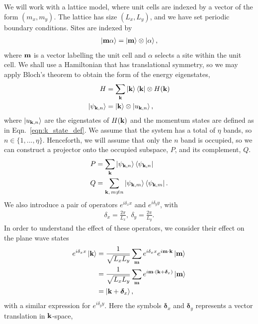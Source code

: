 We will work with a lattice model, where unit cells are indexed by a vector of the form $(m_x,m_y)$. The lattice has size $(L_x,L_y)$, and we have set periodic boundary conditions. Sites are indexed by 
\begin{align}
	\ket{\textbf m \alpha} = \ket{\textbf m} \otimes \ket{\alpha},
\end{align} 
where $\textbf m$ is a vector labelling the unit cell and $\alpha$ selects a site within the unit cell. We shall use a Hamiltonian that has translational symmetry, so we may apply Bloch's theorem to obtain the form of the energy eigenstates,
\begin{align}
	 H &= \sum_{\textbf k} \ket{\textbf k}\bra{\textbf k}\otimes  H(\textbf k) \\ 
	\ket{\psi_{\textbf k, n}} &= \ket{\textbf k} \otimes\ket {u_{\textbf k, n}},
\end{align}
where $\ket {u_{\textbf k, n}}$ are the eigenstates of $ H(\textbf k)$ and the momentum states are defined as in Eqn.~\ref{eqn:k_state_def}. We assume that the system has a total of $\eta$ bands, so $n \in  \{1,...,\eta\}$. Henceforth, we will assume that only the $n$ band is occupied, so we can construct a projector onto the occupied subspace, $ P$, and its complement, $ Q$.
\begin{align}
	 P & = \sum_{\textbf k} \ket{\psi_{\textbf k, n}}\bra{\psi_{\textbf k, n}} \\
	 Q & = \sum_{\textbf k,\, m \neq n} \ket{\psi_{\textbf k, m}}\bra{\psi_{\textbf k, m}}.
\end{align}
We also introduce a pair of operators $e^{i \delta_x  x}$ and $e^{i \delta_y  y}$, 
with
\begin{align}
\delta_x = \frac{2\pi}{L_x} ,\  \delta_y = \frac{2\pi}{L_y}.
\end{align}
In order to understand the effect of these operators, we consider their effect on the plane wave states
\begin{align}
	e^{i \delta_x  x}\ket{\textbf k} &= \frac{1}{\sqrt{L_x L_y}} \sum_{\textbf m} e^{i \delta_x  x} e^{i \textbf m \cdot \textbf k} \ket {\textbf m} \\
	& = \frac{1}{\sqrt{L_x L_y}} \sum_{\textbf m} e^{i \textbf m \cdot (\textbf k + \boldsymbol{\delta}_x)} \ket {\textbf m}\\
	& = \ket{\textbf k + \boldsymbol \delta_x},
\end{align}
with a similar expression for $e^{i \delta_y  y}$. Here the symbols $\boldsymbol{\delta}_x$ and $\boldsymbol{\delta}_y$ represents a vector translation in $\textbf k$-space,
